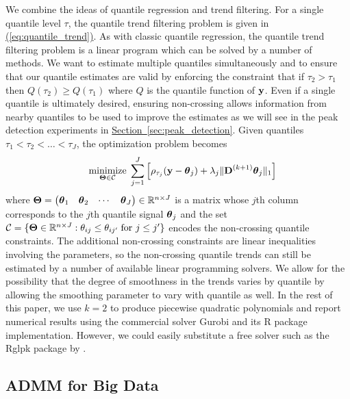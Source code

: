\documentclass[aoas]{imsart}
\newcommand{\Sec}[1]{\hyperref[sec:#1]{Section~\ref*{sec:#1}}} %
\newcommand{\Eqn}[1]{\hyperref[eq:#1]{{\rm (\ref*{eq:#1})}}} %
\newcommand{\Sec}[1]{{Section~\ref{sec:#1}}} %
\newcommand{\Eqn}[1]{{(\ref{eq:#1})}} %
\newcommand{\Real}{\mathbb{R}}
\newcommand{\V}[1]{{\bm{\mathbf{\MakeLowercase{#1}}}}} %
\newcommand{\M}[1]{{\bm{\mathbf{\MakeUppercase{#1}}}}} %
\newcommand{\ME}[2]{\MakeLowercase{#1}_{#2}} %
\newcommand{\Mn}[2]{\M{#1}^{(#2)}} %
\begin{document}
We combine the ideas of quantile regression and trend filtering. For a single quantile level $\tau$, the quantile trend filtering problem is given in \Eqn{quantile_trend}. As with classic quantile regression, the quantile trend filtering problem is a linear program which can be solved by a number of methods. We want to estimate multiple quantiles simultaneously and to ensure that our quantile estimates are valid by enforcing the constraint that if $\tau_2 > \tau_1$ then $Q(\tau_2) \ge Q(\tau_1)$ where $Q$ is the quantile function of $\V{y}$. Even if a single quantile is ultimately desired, ensuring non-crossing allows information from nearby quantiles to be used to improve the estimates as we will see in the peak detection experiments in \Sec{peak_detection}. Given quantiles $\tau_1 < \tau_2 < \ldots < \tau_J$, the optimization problem becomes
\begin{eqnarray}
	\label{eq:noncross_trend}
	&&\underset{\M{\Theta} \in \mathcal{C}}{\text{minimize}}\; \sum_{j=1}^J \left [\rho_{\tau_j}(\V{y} - \V{\theta}_{j}) +
	\lambda_j \lVert \Mn{D}{k+1} \V{\theta}_j \rVert_1 \right ] 
\end{eqnarray}
where $\M{\Theta} = \begin{pmatrix} \V{\theta}_1 & \V{\theta}_2 & \cdots & \V{\theta}_J \end{pmatrix} \in \Real^{n \times J}$ is a matrix whose $j$th column corresponds to the $j$th quantile signal $\V{\theta}_j$ and the set $\mathcal{C} = \{\M{\Theta} \in \Real^{n \times J}: \ME{\theta}{ij} \leq \ME{\theta}{ij'} \;\text{for $j \leq j'$}\}$ encodes the non-crossing quantile constraints. The additional non-crossing constraints are linear inequalities involving the parameters, so the non-crossing quantile trends can still be estimated by a number of available linear programming solvers. We allow for the possibility that the degree of smoothness in the trends varies by quantile by allowing the smoothing parameter to vary with quantile as well. In the rest of this paper, we use $k=2$ to produce piecewise quadratic polynomials and report numerical results using the commercial solver Gurobi \citep{gurobi} and its R package implementation. However, we could easily substitute a free solver such as the Rglpk package by \cite{rglpk}.

\subsection{ADMM for Big Data}
\end{document}

